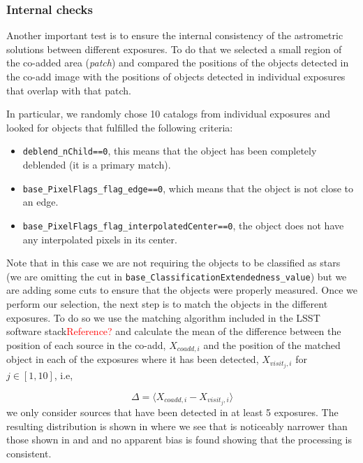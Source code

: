 \documentclass[\docopts]{\docclass}
\begin{document}
\subsubsection{Internal checks}
\label{sec:internal_astrometry}

Another important test is to ensure the internal consistency of the astrometric solutions between different exposures. To do that we selected
a small region of the co-added area (\textit{patch}) and compared the positions of the objects detected in the co-add
image with the positions of objects detected in individual exposures that overlap with that patch.

In particular, we randomly chose 10 catalogs from individual exposures and looked for objects that fulfilled the following criteria:
\begin{itemize}
  \item \texttt{deblend\_nChild==0}, this means that the object has been completely deblended (it is a primary match).
  \item \texttt{base\_PixelFlags\_flag\_edge==0}, which means that the object is not close to an edge.
  \item \texttt{base\_PixelFlags\_flag\_interpolatedCenter==0}, the object does not have any interpolated pixels in its center.
\end{itemize}

Note that in this case we are not requiring the objects to be classified as stars (we are omitting the cut in
\texttt{base\_ClassificationExtendedness\_value}) but we are adding some cuts to ensure that the objects were properly measured. Once
we perform our selection, the next step is to match the objects in the different exposures. To do so we use the matching algorithm
included in the LSST software stack\textcolor{red}{Reference?} and calculate the mean of the difference between the position of each source
in the co-add, $X_{coadd,i}$ and the position of the matched object in each of the exposures where it has been detected, $X_{visit_{j},i}$
for $j \in [1,10]$, i.e,

\begin{equation}
  \Delta = \langle X_{coadd,i} - X_{visit_{j},i} \rangle
\end{equation}
we only consider sources that have been detected in at least 5 exposures. The resulting distribution is shown in 
where we see that is noticeably narrower than those shown in  and  and no apparent bias is found showing
that the processing is consistent.
\end{document}
